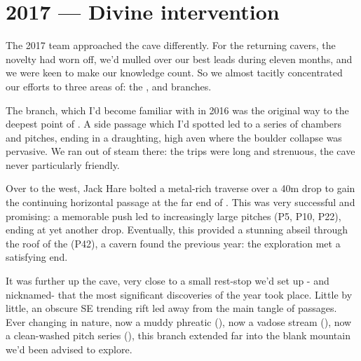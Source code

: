 \section{2017 --- Divine intervention}
The 2017 team approached the cave differently. For the returning cavers, the novelty had worn off, we’d mulled over our best leads during eleven months, and we were keen to make our knowledge count. So we almost tacitly concentrated our efforts to three areas of: the ,  and  branches.

The  branch, which I’d become familiar with in 2016 was the original way to the deepest point of . A side passage which I’d spotted led to a series of chambers and pitches, ending in a draughting, high aven where the boulder collapse was pervasive. We ran out of steam there: the trips were long and strenuous, the cave never particularly friendly.

Over to the west, Jack Hare bolted a metal-rich traverse over a 40m drop to gain the continuing horizontal passage at the far end of . This was very successful and promising: a memorable push led to increasingly large pitches (P5, P10, P22), ending at yet another drop. Eventually, this provided a stunning abseil through the roof of the  (P42), a cavern found the previous year: the exploration met a satisfying end.

It was further up the cave, very close to a small rest-stop we’d set up - and nicknamed- that the most significant discoveries of the year took place. Little by little, an obscure SE trending rift led away from the main tangle of passages. Ever changing in nature, now a muddy phreatic (), now a vadose stream (), now a clean-washed pitch series (), this branch extended far into the blank mountain we’d been advised to explore.  

